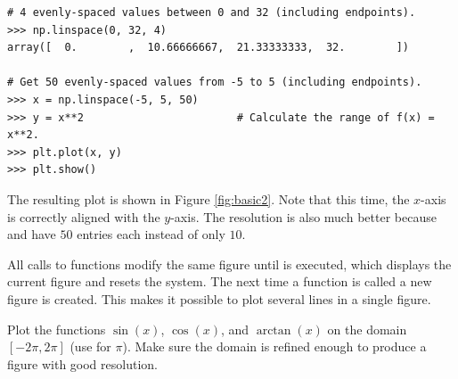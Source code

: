 \begin{lstlisting}
# 4 evenly-spaced values between 0 and 32 (including endpoints).
>>> np.linspace(0, 32, 4) 
array([  0.        ,  10.66666667,  21.33333333,  32.        ])

# Get 50 evenly-spaced values from -5 to 5 (including endpoints).
>>> x = np.linspace(-5, 5, 50)
>>> y = x**2                        # Calculate the range of f(x) = x**2.
>>> plt.plot(x, y)
>>> plt.show()
\end{lstlisting}

The resulting plot is shown in Figure \ref{fig:basic2}.
Note that this time, the $x$-axis is correctly aligned with the $y$-axis.
The resolution is also much better because  and  have $50$ entries each instead of only $10$.

All calls to  functions modify the same figure until  is executed, which displays the current figure and resets the system.
The next time a  function is called a new figure is created.
This makes it possible to plot several lines in a single figure.

\begin{problem} %
Plot the functions $\sin(x)$, $\cos(x)$, and $\arctan(x)$ on the domain $[-2\pi, 2\pi]$ (use  for $\pi$).
Make sure the domain is refined enough to produce a figure with good resolution.
\end{problem}

